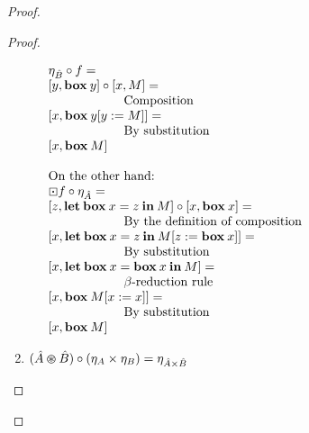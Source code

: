 \documentclass[a4paper]{article}
\begin{document}
\begin{proof}
\begin{proof}
\begin{enumerate}
$\begin{array}{lll}
&\eta_{\hat{B}} \circ f = & \\
&[y, {\bf box \:} y] \circ [x, M] = &\\
&\quad\quad\quad\quad\quad\quad \text{Composition} & \\
&[x, {\bf box \:} y [y := M]] = &\\
&\quad\quad\quad\quad\quad\quad \text{By substitution}& \\
&[x, {\bf box \:} M]& \\
& &\\
&\text{On the other hand:}& \\
&\boxdot f \circ \eta_{\hat{A}} = & \\
&[z, {\bf let \: box \:} x = z {\: \bf in \:} M] \circ [x, {\bf box \:} x] = &\\
&\quad\quad\quad\quad\quad\quad \text{By the definition of composition}& \\
&[x, {\bf let \: box \:} x = z {\: \bf in \:} M [z := {\bf box \:} x]] = & \\
&\quad\quad\quad\quad\quad\quad \text{By substitution}& \\
&[x, {\bf let \: box \:} x = {\bf box \:} x {\: \bf in \:} M] = & \\
&\quad\quad\quad\quad\quad\quad \text{$\beta$-reduction rule}& \\
&[x, {\bf box \:} M [x := x]] = &\\
&\quad\quad\quad\quad\quad\quad \text{By substitution} & \\
&[x, {\bf box \:} M]&
\end{array}$

\item $(\hat{A} \varoast \hat{B}) \circ (\eta_{A} \times \eta_{B}) = \eta_{\hat{A} \times \hat{B}}$ \\


\end{enumerate}
\end{proof}
\end{proof}
\end{document}
